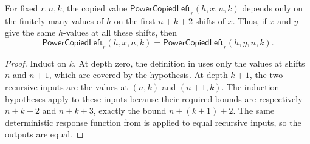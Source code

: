 \begin{lemma}
For fixed $r,n,k$, the copied value
$\mathsf{PowerCopiedLeft}_r(h,x,n,k)$ depends only on the finitely many
values of $h$ on the first $n+k+2$ shifts of $x$.  Thus, if $x$ and $y$
give the same $h$-values at all these shifts, then
\[
\mathsf{PowerCopiedLeft}_r(h,x,n,k)
=\mathsf{PowerCopiedLeft}_r(h,y,n,k).
\]
\end{lemma}
\begin{proof}
Induct on $k$.  At depth zero, the definition in
 uses only the values at shifts $n$ and $n+1$,
which are covered by the hypothesis.  At depth $k+1$, the two recursive
inputs are the values at $(n,k)$ and $(n+1,k)$.  The induction hypotheses
apply to these inputs because their required bounds are respectively
$n+k+2$ and $n+k+3$, exactly the bound
$n+(k+1)+2$.  The same deterministic response function from
 is applied to equal recursive inputs, so the
outputs are equal.
\end{proof}
